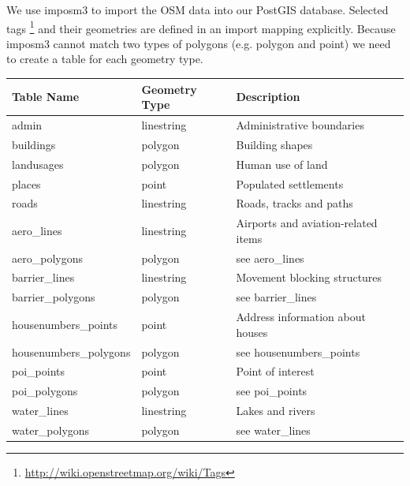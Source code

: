 We use imposm3 to import the OSM data into our PostGIS database.
Selected tags \footnote{\url{http://wiki.openstreetmap.org/wiki/Tags}} and their geometries are defined in an import mapping explicitly.
Because imposm3 cannot match two types of polygons (e.g. polygon and point) we need
to create a table for each geometry type.

\begin{flushleft}
    \begin{tabular}{lll}
    \hline
    Table Name            & Geometry Type & Description \\
    \hline                                          
    admin                  & linestring    & Administrative boundaries \\
    buildings              & polygon       & Building shapes                            \\
    landusages             & polygon       & Human use of land \\
    places                 & point         & Populated settlements                      \\
    roads                  & linestring    & Roads, tracks and paths          \\
    aero\_lines            & linestring    & Airports and aviation-related items        \\
    aero\_polygons         & polygon       & see aero\_lines                            \\
    barrier\_lines         & linestring    & Movement blocking structures   \\
    barrier\_polygons      & polygon       & see barrier\_lines                         \\
    housenumbers\_points   & point         & Address information about houses \\
    housenumbers\_polygons & polygon       & see housenumbers\_points                   \\
    poi\_points            & point         & Point of interest                          \\
    poi\_polygons          & polygon       & see poi\_points                            \\
    water\_lines           & linestring    & Lakes and rivers                           \\
    water\_polygons        & polygon       & see water\_lines                           \\
    \end{tabular}
\end{flushleft}

